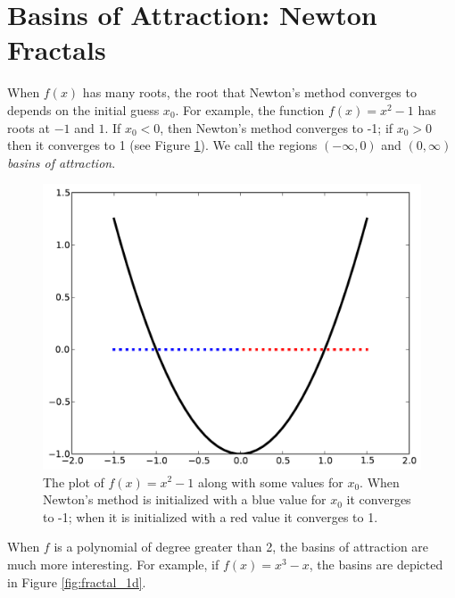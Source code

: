 \section*{Basins of Attraction: Newton Fractals} %

When $f(x)$ has many roots, the root that Newton's method converges to depends on the initial guess $x_0$.
For example, the function $f(x)=x^2-1$ has roots at $-1$ and $1$.
If $x_0<0$, then Newton's method converges to -1; if $x_0>0$ then it converges to 1 (see Figure \ref{fig:basins1}).
We call the regions $(-\infty, 0)$ and $(0, \infty)$ \emph{basins of attraction}.

\begin{figure}
    \centering
    \includegraphics[scale=0.5]{figures/basins1.pdf}
    \caption{The plot of $f(x) = x^2 -1$ along with some values for $x_0$.
    When Newton's method is initialized with a blue value for $x_0$ it converges to -1; when it is initialized with a red value it converges to 1.}
    \label{fig:basins1}
\end{figure}

When $f$ is a polynomial of degree greater than 2, the basins of attraction are much more interesting.
For example, if $f(x) = x^3-x$, the basins are depicted in Figure \ref{fig:fractal_1d}.

